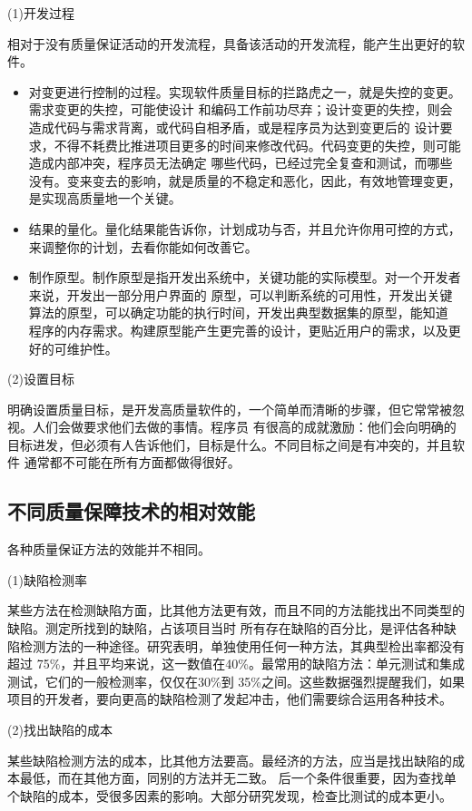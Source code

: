 \documentclass{article}
\begin{document}
\par
(1)开发过程
\par
相对于没有质量保证活动的开发流程，具备该活动的开发流程，能产生出更好的软件。
\begin{itemize}
    \item 对变更进行控制的过程。实现软件质量目标的拦路虎之一，就是失控的变更。需求变更的失控，可能使设计
    和编码工作前功尽弃；设计变更的失控，则会造成代码与需求背离，或代码自相矛盾，或是程序员为达到变更后的
    设计要求，不得不耗费比推进项目更多的时间来修改代码。代码变更的失控，则可能造成内部冲突，程序员无法确定
    哪些代码，已经过完全复查和测试，而哪些没有。变来变去的影响，就是质量的不稳定和恶化，因此，有效地管理变更，
    是实现高质量地一个关键。
    \item 结果的量化。量化结果能告诉你，计划成功与否，并且允许你用可控的方式，来调整你的计划，去看你能如何改善它。
    \item 制作原型。制作原型是指开发出系统中，关键功能的实际模型。对一个开发者来说，开发出一部分用户界面的
    原型，可以判断系统的可用性，开发出关键算法的原型，可以确定功能的执行时间，开发出典型数据集的原型，能知道
    程序的内存需求。构建原型能产生更完善的设计，更贴近用户的需求，以及更好的可维护性。
\end{itemize}

\par
(2)设置目标
\par
明确设置质量目标，是开发高质量软件的，一个简单而清晰的步骤，但它常常被忽视。人们会做要求他们去做的事情。程序员
有很高的成就激励：他们会向明确的目标进发，但必须有人告诉他们，目标是什么。不同目标之间是有冲突的，并且软件
通常都不可能在所有方面都做得很好。

\subsection{不同质量保障技术的相对效能}
各种质量保证方法的效能并不相同。
\par
(1)缺陷检测率
\par
某些方法在检测缺陷方面，比其他方法更有效，而且不同的方法能找出不同类型的缺陷。测定所找到的缺陷，占该项目当时
所有存在缺陷的百分比，是评估各种缺陷检测方法的一种途径。研究表明，单独使用任何一种方法，其典型检出率都没有超过
75\%，并且平均来说，这一数值在40\%。最常用的缺陷方法：单元测试和集成测试，它们的一般检测率，仅仅在30\%到
35\%之间。这些数据强烈提醒我们，如果项目的开发者，要向更高的缺陷检测了发起冲击，他们需要综合运用各种技术。

\par
(2)找出缺陷的成本
\par
某些缺陷检测方法的成本，比其他方法要高。最经济的方法，应当是找出缺陷的成本最低，而在其他方面，同别的方法并无二致。
后一个条件很重要，因为查找单个缺陷的成本，受很多因素的影响。大部分研究发现，检查比测试的成本更小。
\end{document}
